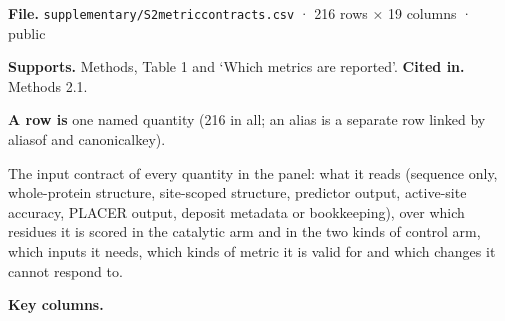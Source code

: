 \documentclass[
  10pt,
]{article}
\DeclareRobustCommand{\_}{\textunderscore\hspace{0pt}}
\begin{document}
\begin{shaded}\small

\textbf{File.}
\texttt{supplementary/S2\_metric\_contracts.csv}
· 216 rows × 19
columns · public

\textbf{Supports.}
Methods, Table 1 and
`Which metrics are
reported'.
\textbf{Cited in.}
Methods 2.1.

\textbf{A row is}
one named quantity
(216 in all; an
alias is a separate
row linked by
alias\_of and
canonical\_key).

\end{shaded}

The input contract
of every quantity in
the panel: what it
reads (sequence
only, whole-protein
structure,
site-scoped
structure, predictor
output, active-site
accuracy, PLACER
output, deposit
metadata or
bookkeeping), over
which residues it is
scored in the
catalytic arm and in
the two kinds of
control arm, which
inputs it needs,
which kinds of
metric it is valid
for and which
changes it cannot
respond to.

\textbf{Key
columns.}
\end{document}
